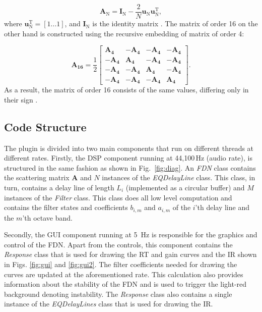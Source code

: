 \documentclass[twoside,a4paper]{article}
\begin{document}
\begin{equation}
\mathbf{A}_\textrm{N} = \mathbf{I}_\textrm{N} - \frac{2}{N} \mathbf{u}_\textrm{N}\mathbf{u}_\textrm{N}^\textrm{T},
\label{eq:house}
\end{equation}
where $\mathbf{u}_\textrm{N}^\textrm{T} = [1...1]$, and $\mathbf{I}_\textrm{N}$ is the identity matrix \cite{Jot:1997:icm}. The matrix of order 16 on the other hand is constructed using the recursive embedding of matrix of order 4:

\begin{equation}
\mathbf{A_{16}} = \frac{1}{2}
    \begin{bmatrix}
         \mathbf{A_{4}}& -\mathbf{A_{4}}& -\mathbf{A_{4}} & -\mathbf{A_{4}} \\
        -\mathbf{A_{4}} & \mathbf{A_{4}} & -\mathbf{A_{4}}& -\mathbf{A_{4}}\\
        -\mathbf{A_{4}} & -\mathbf{A_{4}} & \mathbf{A_{4}} & -\mathbf{A_{4}} \\
         -\mathbf{A_{4}} & -\mathbf{A_{4}} & -\mathbf{A_{4}} & \mathbf{A_{4}}
    \end{bmatrix}.
    \label{eq:embed}
\end{equation}
As a result, the matrix of order 16 consists of the same values, differing only in their sign \cite{PASPWEB2010}.


\subsection{Code Structure}\label{sec:codeStructure}
The plugin is divided into two main components that run on different threads at different rates. Firstly, the DSP component running at 44,100\,Hz (audio rate), is structured in the same fashion as shown in Fig.~\ref{fig:diag}. An \textit{FDN} class contains the scattering matrix $\textbf{A}$ and $N$ instances of the \textit{EQDelayLine} class. This class, in turn, contains a delay line of length $L_i$ (implemented as a circular buffer) and $M$ instances of the \textit{Filter} class. This class does all low level computation and contains the filter states and coefficients $b_{i,m}$ and $a_{i,m}$ of the $i$'th delay line and the $m$'th octave band.

Secondly, the GUI component running at 5\, Hz is responsible for the graphics and control of the FDN. Apart from the controls, this component contains the \textit{Response} class that is used for drawing the RT and gain curves and the IR shown in Figs. \ref{fig:gui} and \ref{fig:gui2}. The filter coefficients needed for drawing the curves are updated at the aforementioned rate. This calculation also provides information about the stability of the FDN and is used to trigger the light-red background denoting instability. The \textit{Response} class also contains a single instance of the \textit{EQDelayLines} class that is used for drawing the IR.
\end{document}
